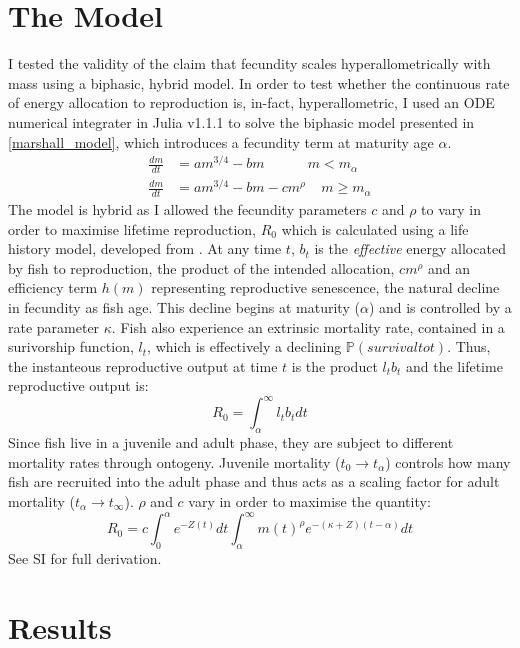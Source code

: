 \documentclass[a4paper]{article} %
\begin{document}
\section{The Model}\thispagestyle{empty}
I tested the validity of the claim that fecundity scales hyperallometrically with mass using a biphasic, hybrid model. In order to test whether the continuous rate of energy allocation to reproduction is, in-fact, hyperallometric, I used an ODE numerical integrater in Julia v1.1.1 \autocite{Bezanson2017} to solve the biphasic model presented in \eqref{marshall_model}, which introduces a fecundity term at maturity age $\alpha$. 
\begin{align*}
    \frac{dm}{dt} &= am^{3/4} - bm \ \ \ \ \ \ \ \ \ \ \ \ \ \ m < m_{\alpha} \\
    \frac{dm}{dt} &= am^{3/4} - bm - cm^{\rho} \ \ \ \ \ m \geq m_{\alpha}
\end{align*}
The model is hybrid as I allowed the fecundity parameters $c$ and $\rho$ to vary in order to maximise lifetime reproduction, $R_0$ which is calculated using a life history model, developed from \cite{Charnov2001}. At any time $t$, $b_{t}$ is the \textit{effective} energy allocated by fish to reproduction, the product of the intended allocation, $cm^{\rho}$ and an efficiency term $h(m)$ representing reproductive senescence, the natural decline in fecundity as fish age. This decline begins at maturity ($\alpha$) and is controlled by a rate parameter $\kappa$. Fish also experience an extrinsic mortality rate, contained in a surivorship function, $l_t$, which is effectively a declining $\mathbb{P}(survival to t)$. Thus, the instanteous reproductive output at time $t$ is the product $l_{t}b_{t}$ and the lifetime reproductive output is:
\begin{equation}
    R_{0} = \int_{\alpha}^{\infty}l_{t}b_{t} dt
\end{equation}
Since fish live in a juvenile and adult phase, they are subject to different mortality rates through ontogeny. Juvenile mortality ($t_0 \rightarrow t_{\alpha}$) controls how many fish are recruited into the adult phase and thus acts as a scaling factor for adult mortality ($t_{\alpha} \rightarrow t_{\infty}$). $\rho$ and $c$ vary in order to maximise the quantity:
\begin{equation}
    R_{0} = c\int_{0}^{\alpha}e^{-Z(t)}dt\int_{\alpha}^{\infty} m(t)^{\rho} e^{-(\kappa+Z)(t-\alpha)} dt
\end{equation}
See SI for full derivation.
\section{Results}\thispagestyle{empty}
\lipsum
\end{document}

